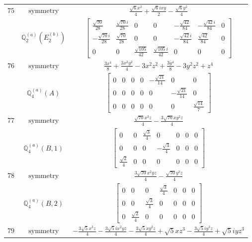 \documentclass[fleqn,8pt,landscape]{jsarticle}
\begin{document}
\begin{longtable}{ccc}
$ 75 $ & $ \text{symmetry} $ & $ \frac{\sqrt{6} x^{2}}{4} + \frac{\sqrt{6} i x y}{2} - \frac{\sqrt{6} y^{2}}{4} $ \\
$  $ & $ \mathbb{Q}_{2}^{(a)}(E_{2}^{(b)}) $ & $ \begin{bmatrix} \frac{\sqrt{70}}{28} & \frac{\sqrt{70} i}{28} & 0 & 0 & - \frac{\sqrt{42}}{84} & - \frac{\sqrt{42} i}{84} & 0 \\ - \frac{\sqrt{70} i}{28} & \frac{\sqrt{70}}{28} & 0 & 0 & - \frac{\sqrt{42} i}{84} & \frac{\sqrt{42}}{84} & 0 \\ 0 & 0 & \frac{\sqrt{105}}{42} & \frac{\sqrt{105} i}{42} & 0 & 0 & 0 \end{bmatrix} $ \\ \hline
$ 76 $ & $ \text{symmetry} $ & $ \frac{3 x^{4}}{8} + \frac{3 x^{2} y^{2}}{4} - 3 x^{2} z^{2} + \frac{3 y^{4}}{8} - 3 y^{2} z^{2} + z^{4} $ \\
$  $ & $ \mathbb{Q}_{4}^{(a)}(A) $ & $ \begin{bmatrix} 0 & 0 & 0 & 0 & - \frac{\sqrt{21}}{14} & 0 & 0 \\ 0 & 0 & 0 & 0 & 0 & - \frac{\sqrt{21}}{14} & 0 \\ 0 & 0 & 0 & 0 & 0 & 0 & \frac{\sqrt{14}}{7} \end{bmatrix} $ \\ \hline
$ 77 $ & $ \text{symmetry} $ & $ \frac{\sqrt{70} x^{3} z}{4} - \frac{3 \sqrt{70} x y^{2} z}{4} $ \\
$  $ & $ \mathbb{Q}_{4}^{(a)}(B,1) $ & $ \begin{bmatrix} 0 & 0 & \frac{\sqrt{3}}{4} & 0 & 0 & 0 & 0 \\ 0 & 0 & 0 & - \frac{\sqrt{3}}{4} & 0 & 0 & 0 \\ \frac{\sqrt{2}}{4} & 0 & 0 & 0 & 0 & 0 & 0 \end{bmatrix} $ \\ \hline
$ 78 $ & $ \text{symmetry} $ & $ \frac{3 \sqrt{70} x^{2} y z}{4} - \frac{\sqrt{70} y^{3} z}{4} $ \\
$  $ & $ \mathbb{Q}_{4}^{(a)}(B,2) $ & $ \begin{bmatrix} 0 & 0 & 0 & \frac{\sqrt{3}}{4} & 0 & 0 & 0 \\ 0 & 0 & \frac{\sqrt{3}}{4} & 0 & 0 & 0 & 0 \\ 0 & \frac{\sqrt{2}}{4} & 0 & 0 & 0 & 0 & 0 \end{bmatrix} $ \\ \hline
$ 79 $ & $ \text{symmetry} $ & $ - \frac{3 \sqrt{5} x^{3} z}{4} - \frac{3 \sqrt{5} i x^{2} y z}{4} - \frac{3 \sqrt{5} x y^{2} z}{4} + \sqrt{5} x z^{3} - \frac{3 \sqrt{5} i y^{3} z}{4} + \sqrt{5} i y z^{3} $ \\

\end{longtable}
\end{document}
